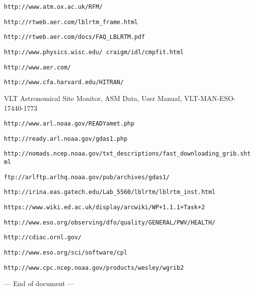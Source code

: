 \documentclass[a4paper,twoside,11pt]{article}
\begin{document}
\begin{thebibliography}{99}
\texttt{http://www.atm.ox.ac.uk/RFM/}

\texttt{http://rtweb.aer.com/lblrtm\_frame.html}

\texttt{http://rtweb.aer.com/docs/FAQ\_LBLRTM.pdf}

\texttt{http://www.physics.wisc.edu/~craigm/idl/cmpfit.html}

\texttt{http://www.aer.com/}

\texttt{http://www.cfa.harvard.edu/HITRAN/}

VLT Astronomical Site Monitor, ASM Data, User Manual, VLT-MAN-ESO-17440-1773

\texttt{http://www.arl.noaa.gov/READYamet.php}

\texttt{http://ready.arl.noaa.gov/gdas1.php}

\texttt{http://nomads.ncep.noaa.gov/txt\_descriptions/fast\_downloading\_grib.shtml}

\texttt{ftp://arlftp.arlhq.noaa.gov/pub/archives/gdas1/}

\texttt{http://irina.eas.gatech.edu/Lab\_5560/lblrtm/lblrtm\_inst.html}

\texttt{https://www.wiki.ed.ac.uk/display/arcwiki/WP+1.1.1+Task+2}

\texttt{http://www.eso.org/observing/dfo/quality/GENERAL/PWV/HEALTH/}

\texttt{http://cdiac.ornl.gov/}

\texttt{http://www.eso.org/sci/software/cpl}

\texttt{http://www.cpc.ncep.noaa.gov/products/wesley/wgrib2}


\end{thebibliography}

\centerline{--- End of document ---}            %
\end{document}
